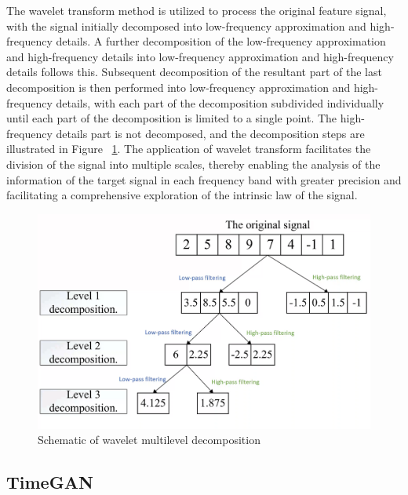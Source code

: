 \documentclass[journal,article,submit,pdftex,moreauthors]{Definitions/mdpi}
\begin{document}
The wavelet transform method is utilized to process the original feature signal, with the signal initially decomposed into low-frequency approximation and high-frequency details. A further decomposition of the low-frequency approximation and high-frequency details into low-frequency approximation and high-frequency details follows this. Subsequent decomposition of the resultant part of the last decomposition is then performed into low-frequency approximation and high-frequency details, with each part of the decomposition subdivided individually until each part of the decomposition is limited to a single point. The high-frequency details part is not decomposed, and the decomposition steps are illustrated in Figure ~\ref{fig:Wavelet Transform}. The application of wavelet transform facilitates the division of the signal into multiple scales, thereby enabling the analysis of the information of the target signal in each frequency band with greater precision and facilitating a comprehensive exploration of the intrinsic law of the signal.

\begin{figure}[H]
    \centering
    \includegraphics[width=0.95\linewidth]{图片/小波变换.png}
    \caption{Schematic of wavelet multilevel decomposition}
    \label{fig:Wavelet Transform}
\end{figure}


\subsection{TimeGAN }
\end{document}
